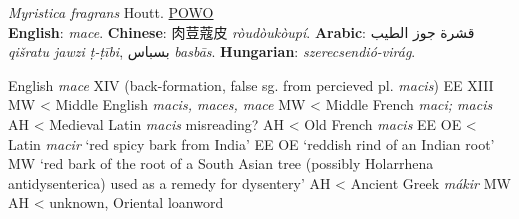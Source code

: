 



\begin{spice}
\textit{Myristica fragrans} Houtt. \hfill \href{https://powo.science.kew.org/taxon/586076-1}{POWO}\\
\textbf{English}: \textit{mace}.
\textbf{Chinese}: 肉荳蔻皮 \textit{ròudòukòupí}.
\textbf{Arabic}: قشرة جوز الطيب \textit{qišratu jawzi ṭ-ṭībi}, بسباس \textit{basbās}.
\textbf{Hungarian}: \textit{szerecsendió-virág}.
\end{spice}

\begin{etymology}
English \textit{mace} XIV (back-formation, false sg. from percieved pl. \textit{macis}) EE XIII MW
< Middle English \textit{macis, maces, mace} MW
< Middle French \textit{maci; macis} AH
< Medieval Latin \textit{macis} misreading? AH
< Old French \textit{macis} EE OE
< Latin \textit{macir} `red spicy bark from India' EE OE `reddish rind of an Indian root' MW `red bark of the root of a South Asian tree (possibly Holarrhena antidysenterica) used as a remedy for dysentery' AH
< Ancient Greek \textit{mákir} MW AH
< unknown, Oriental loanword 
\end{etymology}





